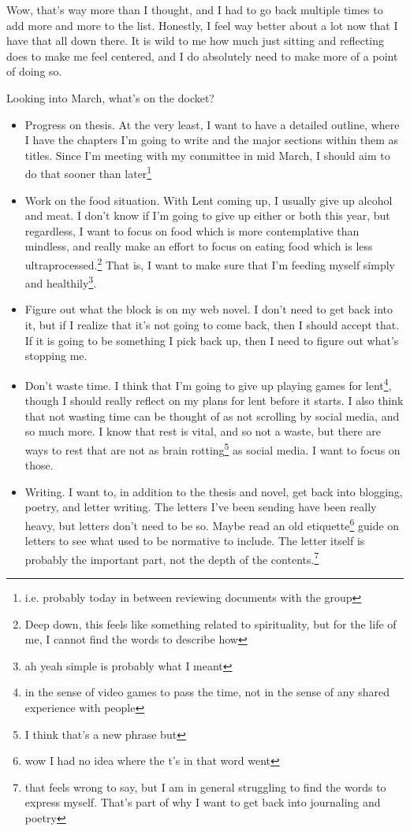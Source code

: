 \documentclass[12pt]{article}[titlepage]
\renewcommand{\,}{\textsuperscript{,}}
\begin{document}
Wow, that's way more than I thought, and I had to go back multiple times to add more and more to the list.  
Honestly, I feel way better about a lot now that I have that all down there.  
It is wild to me how much just sitting and reflecting does to make me feel centered, and I do absolutely need to make more of a point of doing so.

Looking into March, what's on the docket?  
\begin{itemize}  
\item Progress on thesis. At the very least, I want to have a detailed outline, where I have the chapters I'm going to write and the major sections within them as titles. Since I'm meeting with my committee in mid March, I should aim to do that sooner than later\footnote{i.e. probably today in between reviewing documents with the group}  
\item Work on the food situation. With Lent coming up, I usually give up alcohol and meat. I don't know if I'm going to give up either or both this year, but regardless, I want to focus on food which is more contemplative than mindless, and really make an effort to focus on eating food which is less ultraprocessed.\footnote{Deep down, this feels like something related to spirituality, but for the life of me, I cannot find the words to describe how} That is, I want to make sure that I'm feeding myself simply and healthily\footnote{ah yeah simple is probably what I meant}.  
\item Figure out what the block is on my web novel. I don't need to get back into it, but if I realize that it's not going to come back, then I should accept that. If it is going to be something I pick back up, then I need to figure out what's stopping me.  
\item Don't waste time. I think that I'm going to give up playing games for lent\footnote{in the sense of video games to pass the time, not in the sense of any shared experience with people}, though I should really reflect on my plans for lent before it starts. I also think that not wasting time can be thought of as not scrolling by social media, and so much more. I know that rest is vital, and so not a waste, but there are ways to rest that are not as brain rotting\footnote{I think that's a new phrase but} as social media. I want to focus on those.  
\item Writing. I want to, in addition to the thesis and novel, get back into blogging, poetry, and letter writing. The letters I've been sending have been really heavy, but letters don't need to be so. Maybe read an old etiquette\footnote{wow I had no idea where the t's in that word went} guide on letters to see what used to be normative to include. The letter itself is probably the important part, not the depth of the contents.\footnote{that feels wrong to say, but I am in general struggling to find the words to express myself. That's part of why I want to get back into journaling and poetry}  

\end{itemize}
\end{document}

